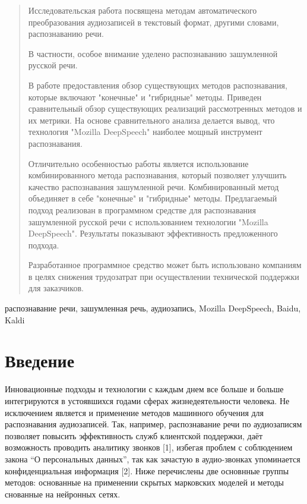 \documentclass[conference]{IEEEtran}
\begin{document}
    \begin{abstract}
        Исследовательская работа посвящена методам автоматического преобразования аудиозаписей в текстовый формат, другими словами, распознаванию речи.

        В частности, особое внимание уделено распознаванию зашумленной русской речи.

        В работе предоставления обзор существующих методов распознавания, которые включают "конечные" и "гибридные" методы.
        Приведен сравнительный обзор существующих реализаций рассмотренных методов и их метрики.
        На основе сравнительного анализа делается вывод, что технология "Mozilla DeepSpeech" наиболее мощный инструмент распознавания.

        Отличительно особенностью работы является использование комбинированного метода распознавания, который позволяет улучшить качество распознавания зашумленной речи.
        Комбинированный метод объединяет в себе "конечные" и "гибридные" методы.
        Предлагаемый подход реализован в программном средстве для распознавания зашумленной русской речи с использованием технологии "Mozilla DeepSpeech".
        Результаты показывают эффективность предложенного подхода.

        Разработанное программное средство может быть использовано компаниям в целях снижения трудозатрат при осуществлении технической поддержки для заказчиков.
    \end{abstract}

    \begin{IEEEkeywords}
        распознавание речи, зашумленная речь, аудиозапись, Mozilla DeepSpeech, Baidu, Kaldi
    \end{IEEEkeywords}


    \section{Введение}

    Инновационные подходы и технологии с каждым днем все больше и больше интегрируются в устоявшихся годами сферах жизнедеятельности человека.
    Не исключением является и применение методов машинного обучения для распознавания аудиозаписей.
    Так, например, распознавание речи по аудиозаписям позволяет повысить эффективность служб клиентской поддержки, даёт возможность проводить аналитику звонков [1],
    избегая проблем с соблюдением закона “О персональных данных”, так как зачастую в аудио-звонках упоминается конфиденциальная информация [2].
    Ниже перечислены две основнные группы методов: основанные на применении скрытых марковских моделей и методы снованные на нейронных сетях.
\end{document}
